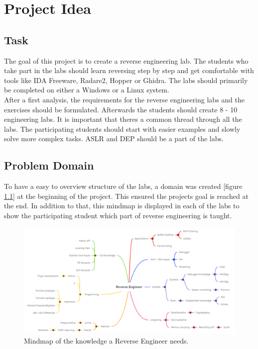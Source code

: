 \chapter{Project Idea}
\section{Task}
\label{sec:task}
The goal of this project is to create a reverse engineering lab. The students who take part in the labs should learn reversing step by step and get comfortable with tools like IDA Freeware, Radare2, Hopper or Ghidra. The labs should primarily be completed on either a Windows or a Linux system. \\
After a first analysis, the requirements for the reverse engineering labs and the exercises should be formulated. Afterwards the students should create 8 - 10 engineering labs. It is important that theres a common thread through all the labs. The participating students should start with easier examples and slowly solve more complex tasks. ASLR and DEP should be a part of the labs.

\section{Problem Domain}
To have a easy to overview structure of the labs, a domain was created [figure \ref{fig:mindmap}] at the beginning of the project. This ensured the projects goal is reached at the end. In addition to that, this mindmap is displayed in each of the labs to show the participating student which part of reverse engineering is taught.
\begin{figure}[H]
    \includegraphics[width=\linewidth, center]{resources/RE_Domain_Light.png}
    \caption{Mindmap of the knowledge a Reverse Engineer needs.}
    \label{fig:mindmap}
\end{figure}

